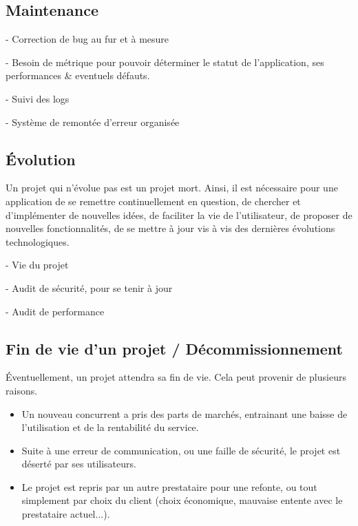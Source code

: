 \subsection{Maintenance}

- Correction de bug au fur et à mesure

- Besoin de métrique pour pouvoir déterminer le statut de l'application, ses performances \& eventuels défauts.

- Suivi des logs 

- Système de remontée d'erreur organisée


\subsection{Évolution}

Un projet qui n'évolue pas est un projet mort. Ainsi, il est nécessaire pour une application de se remettre continuellement en question, de chercher et d'implémenter de nouvelles idées, de faciliter la vie de l'utilisateur, de proposer de nouvelles fonctionnalités, de se mettre à jour vis à vis des dernières évolutions technologiques.


- Vie du projet

- Audit de sécurité, pour se tenir à jour

- Audit de performance

\subsection{Fin de vie d'un projet / Décommissionnement}

Éventuellement, un projet attendra sa fin de vie. Cela peut provenir de plusieurs raisons.

\begin{itemize}
	\item Un nouveau concurrent a pris des parts de marchés, entrainant une baisse de l'utilisation et de la rentabilité du service.
	\item Suite à une erreur de communication, ou une faille de sécurité, le projet est déserté par ses utilisateurs.
	\item Le projet est repris par un autre prestataire pour une refonte, ou tout simplement par choix du client (choix économique, mauvaise entente avec le prestataire actuel...).
\end{itemize}


